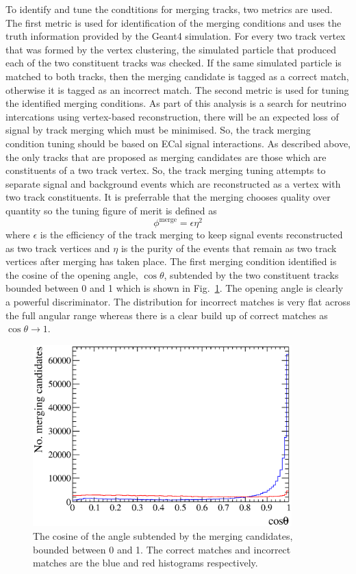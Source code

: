 To identify and tune the condtitions for merging tracks, two metrics are used.  The first metric is used for identification of the merging conditions and uses the truth information provided by the Geant4 simulation.  For every two track vertex that was formed by the vertex clustering, the simulated particle that produced each of the two constituent tracks was checked.  If the same simulated particle is matched to both tracks, then the merging candidate is tagged as a correct match, otherwise it is tagged as an incorrect match.  The second metric is used for tuning the identified merging conditions.  As part of this analysis is a search for neutrino intercations using vertex-based reconstruction, there will be an expected loss of signal by track merging which must be minimised.  So, the track merging condition tuning should be based on ECal signal interactions.  As described above, the only tracks that are proposed as merging candidates are those which are constituents of a two track vertex.  So, the track merging tuning attempts to separate signal and background events which are reconstructed as a vertex with two track constituents.  It is preferrable that the merging chooses quality over quantity so the tuning figure of merit is defined as 
\begin{equation}
  \phi^{\textrm{merge}} = \epsilon \eta^2
  \label{eqn:TrackMergingTuningMetric}
\end{equation}
where $\epsilon$ is the efficiency of the track merging to keep signal events reconstructed as two track vertices and $\eta$ is the purity of the events that remain as two track vertices after merging has taken place.
\newline
\newline
The first merging condition identified is the cosine of the opening angle, $\cos\theta$, subtended by the two constituent tracks bounded between 0 and 1 which is shown in Fig.~\ref{fig:TrackMergingConditionCosTheta}.  The opening angle is clearly a powerful discriminator.  The distribution for incorrect matches is very flat across the full angular range whereas there is a clear build up of correct matches as $\cos\theta \rightarrow 1$.
\begin{figure}[!t]
  \centering
  \includegraphics[width=10cm]{images/selection/vertex_recon/merging_candidates_cos_theta}
  \caption{The cosine of the angle subtended by the merging candidates, bounded between 0 and 1. The correct matches and incorrect matches are the blue and red histograms respectively.}
  \label{fig:TrackMergingConditionCosTheta}
\end{figure}
